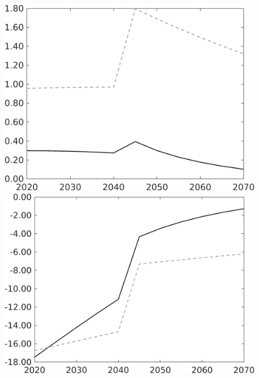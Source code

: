 \begin{figure}[h!!]
\begin{minipage}[]{0.32\textwidth}
	\end{minipage}	
	\begin{minipage}[]{0.32\textwidth}
		\includegraphics[width=1\textwidth]{../../codding_model/own_basedOnFried/optimalPol_010922_revision/figures/all_13Sept22/CompTaufPER_bytaul_KN_Reg0_gAn_spillover0_nsk0_xgr0_knspil0_sep0_LFlimit1_emsbase0_countec0_GovRev0_etaa0.79_lgd0.png} \end{minipage}	
	\begin{minipage}[]{0.32\textwidth}
		\includegraphics[width=1\textwidth]{../../codding_model/own_basedOnFried/optimalPol_010922_revision/figures/all_13Sept22/CompTaufPER_bytaul_KN_Reg0_gAg_spillover0_nsk0_xgr0_knspil0_sep0_LFlimit1_emsbase0_countec0_GovRev0_etaa0.79_lgd0.png} 
	\end{minipage}	
\end{figure}


